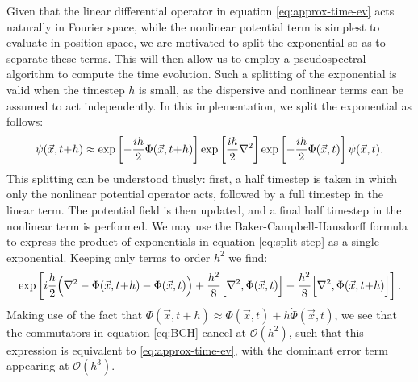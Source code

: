 \documentclass[a4paper,11pt]{article}
\begin{document}
Given that the linear differential operator in equation \ref{eq:approx-time-ev} acts naturally in Fourier space, while the nonlinear potential term is simplest to evaluate in position space, we are motivated to split the exponential so as to separate these terms. This will then allow us to employ a pseudospectral algorithm to compute the time evolution. Such a splitting of the exponential is valid when the timestep $h$ is small, as the dispersive and nonlinear terms can be assumed to act independently. In this implementation, we split the exponential as follows:
\begin{equation}\label{eq:split-step}
    \psi(\vec{x},t\hspace*{-.2em}+\hspace*{-.2em}h)\approx\operatorname{exp}\left[-\frac{ih}{2}\Phi(\vec{x},t\hspace*{-.2em}+\hspace*{-.2em}h)\right]\operatorname{exp}\left[\frac{ih}{2}\nabla^2\right]\operatorname{exp}\left[-\frac{ih}{2}\Phi(\vec{x},t)\right]\psi(\vec{x},t).
\end{equation}
This splitting can be understood thusly: first, a half timestep is taken in which only the nonlinear potential operator acts, followed by a full timestep in the linear term. The potential field is then updated, and a final half timestep in the nonlinear term is performed. We may use the Baker-Campbell-Hausdorff formula to express the product of exponentials in equation \ref{eq:split-step} as a single exponential. Keeping only terms to order $h^2$ we find:
\begin{equation}\label{eq:BCH}
    \operatorname{exp}\left[i\frac{h}{2}\Big(\nabla^2-\Phi(\vec{x},t\hspace*{-.2em}+\hspace*{-.2em}h)-\Phi(\vec{x},t)\Big)+\frac{h^2}{8}\Big[\nabla^2,\Phi(\vec{x},t)\Big]-\frac{h^2}{8}\Big[\nabla^2,\Phi(\vec{x},t\hspace*{-.2em}+\hspace*{-.2em}h)\Big]\right].
\end{equation}
Making use of the fact that $\Phi(\vec{x},t+h)\approx\Phi(\vec{x},t)+h\Dot{\Phi}(\vec{x},t)$, we see that the commutators in equation \ref{eq:BCH} cancel at $\mathcal{O}(h^2)$, such that this expression is equivalent to \ref{eq:approx-time-ev}, with the dominant error term appearing at $\mathcal{O}(h^3)$. 
\end{document}
